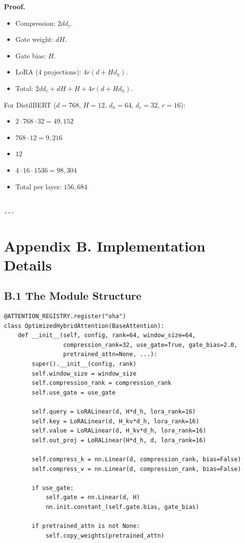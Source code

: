\textbf{Proof.}
\begin{itemize}
\item Compression: $2 d d_c$.
\item Gate weight: $d H$.
\item Gate bias: $H$.
\item LoRA (4 projections): $4 r(d + H d_h)$.
\item Total: $2 d d_c + d H + H + 4 r(d + H d_h)$.

\end{itemize}
For DistilBERT ($d = 768$, $H = 12$, $d_h = 64$, $d_c = 32$, $r = 16$):
\begin{itemize}
\item $2 \cdot 768 \cdot 32 = 49,152$
\item $768 \cdot 12 = 9,216$
\item $12$
\item $4 \cdot 16 \cdot 1536 = 98,304$
\item Total per layer: $156,684$
\end{itemize}
\begin{lstlisting}

---
\end{lstlisting}


\section{Appendix B. Implementation Details}

\subsection{B.1 The Module Structure}

\begin{lstlisting}
@ATTENTION_REGISTRY.register("oha")
class OptimizedHybridAttention(BaseAttention):
    def __init__(self, config, rank=64, window_size=64,
                 compression_rank=32, use_gate=True, gate_bias=2.0,
                 pretrained_attn=None, ...):
        super().__init__(config, rank)
        self.window_size = window_size
        self.compression_rank = compression_rank
        self.use_gate = use_gate
        
        self.query = LoRALinear(d, H*d_h, lora_rank=16)
        self.key = LoRALinear(d, H_kv*d_h, lora_rank=16)
        self.value = LoRALinear(d, H_kv*d_h, lora_rank=16)
        self.out_proj = LoRALinear(H*d_h, d, lora_rank=16)
        
        self.compress_k = nn.Linear(d, compression_rank, bias=False)
        self.compress_v = nn.Linear(d, compression_rank, bias=False)
        
        if use_gate:
            self.gate = nn.Linear(d, H)
            nn.init.constant_(self.gate.bias, gate_bias)
        
        if pretrained_attn is not None:
            self.copy_weights(pretrained_attn)
\end{lstlisting}


